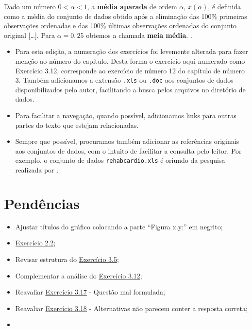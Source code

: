 \documentclass[
]{latex/krantz}
\providecommand{\tightlist}{%
  \setlength{\itemsep}{0pt}\setlength{\parskip}{0pt}}
\renewenvironment{quote}{\begin{VF}}{\end{VF}}
\theoremstyle{definition}
\theoremstyle{definition}
\theoremstyle{definition}
\theoremstyle{definition}
\theoremstyle{remark}
\begin{document}
\begin{quote}
Dado um número \(0 < \alpha < 1\), a \textbf{média aparada} de ordem \(\alpha\), \(\overline{x}(\alpha)\), é definida como a média do conjunto de dados obtido após a eliminação das 100\% primeiras observações ordenadas e das 100\% últimas observações ordenadas do conjunto original {[}\ldots{]}. Para \(\alpha = 0,25\) obtemos a chamada \textbf{meia média}. \citep[p.~47]{MorettinSinger2022}.
\end{quote}

\begin{itemize}
\tightlist
\item
  Para esta edição, a numeração dos exercícios foi levemente alterada para fazer menção ao número do capitulo. Desta forma o exercício aqui numerado como Exercício 3.12, corresponde ao exercício de número 12 do capítulo de número 3. Também adicionamos a extensão \texttt{.xls} ou \texttt{.doc} aos conjuntos de dados disponibilizados pelo autor, facilitando a busca pelos arquivos no diretório de dados.
\item
  Para facilitar a navegação, quando possível, adicionamos links para outras partes do texto que estejam relacionadas.
\item
  Sempre que possível, procuramos também adicionar as referências originais aos conjuntos de dados, com o intuito de facilitar a consulta pelo leitor. Por exemplo, o conjunto de dados \texttt{rehabcardio.xls} é oriundo da pesquisa realizada por \citet{CarvalhoEtAl2007}.
\end{itemize}

\hypertarget{penduxeancias}{%
\section*{Pendências}\label{penduxeancias}}

\begin{itemize}
\tightlist
\item
  Ajustar títulos do gráfico colocando a parte ``Figura x.y:'' em negrito;
\item
  \protect\hyperlink{exr2-2}{Exercício 2.2};
\item
  Revisar estrutura do \protect\hyperlink{exr3-5}{Exercício 3.5};
\item
  Complementar a análise do \protect\hyperlink{exr3-12}{Exercício 3.12};
\item
  Reavaliar \protect\hyperlink{exr3-17}{Exercício 3.17} - Questão mal formulada;
\item
  Reavaliar \protect\hyperlink{exr3-18}{Exercício 3.18} - Alternativas não parecem conter a resposta correta;
\item
\end{itemize}
\end{document}

